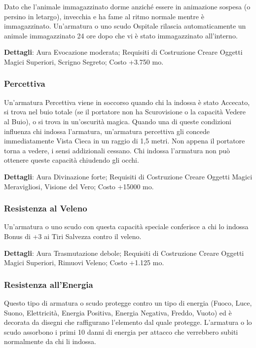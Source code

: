 \begin{multicols}{2}
Dato che l'animale immagazzinato dorme anziché essere in animazione sospesa (o persino in letargo), invecchia e ha fame al ritmo normale mentre è immagazzinato. Un'armatura o uno scudo Ospitale rilascia automaticamente un animale immagazzinato 24 ore dopo che vi è stato immagazzinato all'interno.

\textbf{Dettagli}: Aura Evocazione moderata; Requisiti di Costruzione Creare Oggetti Magici Superiori, Scrigno Segreto; Costo +3.750 mo.


\subsubsection*{Percettiva}

Un'armatura Percettiva viene in soccorso quando chi la indossa è stato Accecato, si trova nel buio totale (se il portatore non ha Scurovisione o la capacità Vedere al Buio), o si trova in un'oscurità magica. Quando una di queste condizioni influenza chi indossa l'armatura, un'armatura percettiva gli concede immediatamente Vista Cieca in un raggio di 1,5 metri. Non appena il portatore torna a vedere, i sensi addizionali cessano. Chi indossa l'armatura non può ottenere queste capacità chiudendo gli occhi.

\textbf{Dettagli}: Aura Divinazione forte; Requisiti di Costruzione Creare Oggetti Magici Meravigliosi, Visione del Vero; Costo +15000 mo.

\subsubsection*{Resistenza al Veleno}

Un'armatura o uno scudo con questa capacità speciale conferisce a chi lo indossa Bonus di +3 ai Tiri Salvezza contro il veleno.

\textbf{Dettagli}: Aura Trasmutazione debole; Requisiti di Costruzione Creare Oggetti Magici Superiori, Rimuovi Veleno; Costo +1.125 mo.

\subsubsection*{Resistenza all'Energia}

Questo tipo di armatura o scudo protegge contro un tipo di energia (Fuoco, Luce, Suono, Elettricità, Energia Positiva, Energia Negativa, Freddo, Vuoto) ed è decorata da disegni che raffigurano l'elemento dal quale protegge. L'armatura o lo scudo assorbono i primi 10 danni di energia per attacco che verrebbero subiti normalmente da chi li indossa.


\end{multicols}
